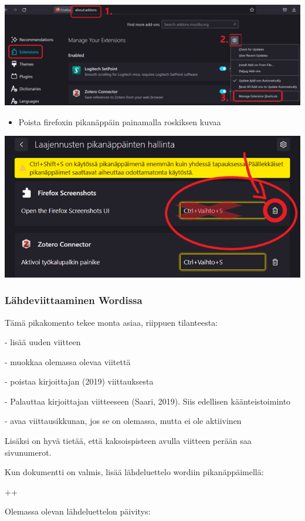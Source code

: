 \documentclass[a4paper,12pt]{scrartcl}
\begin{document}
\includegraphics[width=\textwidth]{firefox1}
\begin{itemize}
	\item Poista firefoxin pikanäppäin painamalla roskiksen kuvaa
\end{itemize}
\includegraphics[width=\textwidth]{firefox2}

\subsubsection{Lähdeviittaaminen Wordissa}

Tämä pikakomento tekee monta asiaa, riippuen tilanteesta:

- lisää uuden viitteen

- muokkaa olemassa olevaa viitettä

- poistaa kirjoittajan (2019) viittauksesta

- Palauttaa kirjoittajan viitteeseen (Saari, 2019). Siis edellisen käänteistoiminto

- avaa viittausikkunan, jos se on olemassa, mutta ei ole aktiivinen


Lisäksi on hyvä tietää, että kaksoispisteen \keys{:} avulla viitteen perään saa sivunumerot.

Kun dokumentti on valmis, lisää lähdeluettelo wordiin pikanäppäimellä:

\keys{\ctrl}++

Olemassa olevan lähdeluettelon päivitys:
\end{document}
